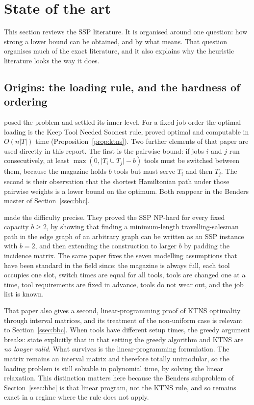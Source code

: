 \section{State of the art}\label{sec:sota}

This section reviews the SSP literature. It is organised around one question:
how strong a lower bound can be obtained, and by what means. That question
organises much of the exact literature, and it also explains why the heuristic
literature looks the way it does.

\subsection{Origins: the loading rule, and the hardness of ordering}\label{ssec:sota-origins}

\citet{Tang1988} posed the problem and settled its inner level. For a fixed job
order the optimal loading is the Keep Tool Needed Soonest rule, proved optimal and
computable in $O(n\lvert T\rvert)$ time (Proposition~\ref{prop:ktns}). Two further
elements of that paper are used directly in this report. The first is the pairwise
bound: if jobs $i$ and $j$ run consecutively, at least
$\max(0,\lvert T_i\cup T_j\rvert-b)$ tools must be switched between them, because
the magazine holds $b$ tools but must serve $T_i$ and then $T_j$. The second is
their observation that the shortest Hamiltonian path under those pairwise weights
is a lower bound on the optimum. Both reappear in the Benders master of
Section~\ref{ssec:bbc}.

\citet{Crama1994} made the difficulty precise. They proved the SSP NP-hard for every
fixed capacity $b\ge2$, by showing that finding a minimum-length travelling-salesman
path in the edge graph of an arbitrary graph can be written as an SSP instance with
$b=2$, and then extending the construction to larger $b$ by padding the incidence
matrix. The same paper fixes the seven modelling assumptions that have been standard
in the field since: the magazine is always full, each tool occupies one slot, switch
times are equal for all tools, tools are changed one at a time, tool requirements are
fixed in advance, tools do not wear out, and the job list is known.

That paper also gives a second, linear-programming proof of KTNS optimality through
interval matrices, and its treatment of the non-uniform case is relevant to
Section~\ref{ssec:bbc}. When tools have different setup times, the greedy argument
breaks: \citet{Crama1994} state explicitly that in that setting the greedy algorithm
and KTNS are \emph{no longer valid}. What survives is the linear-programming
formulation. The matrix remains an interval matrix and therefore totally unimodular,
so the loading problem is still solvable in polynomial time, by solving the linear
relaxation. This distinction matters here because the Benders subproblem of
Section~\ref{ssec:bbc} is that linear program, not the KTNS rule, and so remains
exact in a regime where the rule does not apply.

